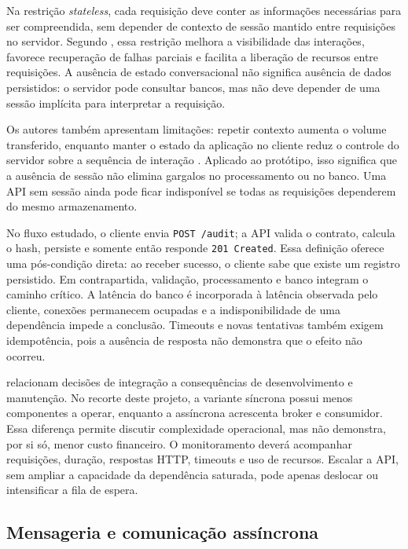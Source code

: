 Na restrição \textit{stateless}, cada requisição deve conter as informações necessárias para ser compreendida, sem depender de contexto de sessão mantido entre requisições no servidor. Segundo , essa restrição melhora a visibilidade das interações, favorece recuperação de falhas parciais e facilita a liberação de recursos entre requisições. A ausência de estado conversacional não significa ausência de dados persistidos: o servidor pode consultar bancos, mas não deve depender de uma sessão implícita para interpretar a requisição.

Os autores também apresentam limitações: repetir contexto aumenta o volume transferido, enquanto manter o estado da aplicação no cliente reduz o controle do servidor sobre a sequência de interação \cite{fielding2002}. Aplicado ao protótipo, isso significa que a ausência de sessão não elimina gargalos no processamento ou no banco. Uma API sem sessão ainda pode ficar indisponível se todas as requisições dependerem do mesmo armazenamento.

No fluxo estudado, o cliente envia \texttt{POST /audit}; a API valida o contrato, calcula o hash, persiste e somente então responde \texttt{201 Created}. Essa definição oferece uma pós-condição direta: ao receber sucesso, o cliente sabe que existe um registro persistido. Em contrapartida, validação, processamento e banco integram o caminho crítico. A latência do banco é incorporada à latência observada pelo cliente, conexões permanecem ocupadas e a indisponibilidade de uma dependência impede a conclusão. Timeouts e novas tentativas também exigem idempotência, pois a ausência de resposta não demonstra que o efeito não ocorreu.

 relacionam decisões de integração a consequências de desenvolvimento e manutenção. No recorte deste projeto, a variante síncrona possui menos componentes a operar, enquanto a assíncrona acrescenta broker e consumidor. Essa diferença permite discutir complexidade operacional, mas não demonstra, por si só, menor custo financeiro. O monitoramento deverá acompanhar requisições, duração, respostas HTTP, timeouts e uso de recursos. Escalar a API, sem ampliar a capacidade da dependência saturada, pode apenas deslocar ou intensificar a fila de espera.

\subsection{Mensageria e comunicação assíncrona}

